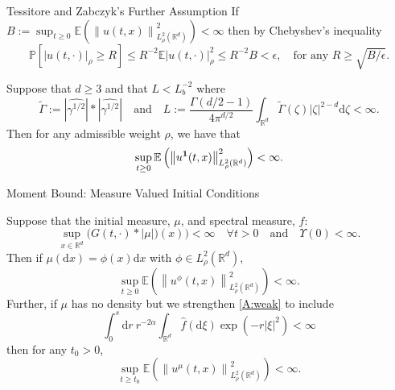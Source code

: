 \documentclass{beamer}%
\numberwithin{equation}{section}
\newcommand{\R}{\mathbb{R}}
\newcommand{\E}{\mathbb{E}}
\newcommand{\Norm}[1]{\left\|  #1   \right\|}
\newcommand{\ud}{\ensuremath{\mathrm{d} }}
\begin{document}
\begin{frame}{Tessitore and Zabczyk's Further Assumption}
	If $B:=\sup_{t \ge 0} \mathbb{E}\left( \Norm{u(t,x)}_{L^2_{\rho}(\R^d)}^2 \right) < \infty$ then by Chebyshev's inequality 
	\[
		\mathbb{P}[|u(t,\cdot)|_\rho \ge R] \le R^{-2}\E |u(t,\cdot)|_\rho^2 \le R^{-2}B < \epsilon, \quad \text{for any } R \ge \sqrt{B/\epsilon}.
	\]
	\begin{theorem}
		Suppose that $d \ge 3$ and that $L < L_b^{-2}$ where 
		\[
			\tilde{\Gamma} := \left|\widehat{\gamma^{1/2}}\right| * \left|\widehat{\gamma^{1/2}}\right| \quad \text{and} \quad L:= \frac{\Gamma(d/2-1)}{4\pi^{d/2}}\int_{\R^d} \tilde\Gamma(\zeta) |\zeta|^{2-d} \ud \zeta < \infty.
		\]
		Then for any admissible weight $\rho$, we have that 
			\[
			\sup_{t \ge 0} \mathbb{E}\left( \Norm{u^{\bf 1}(t,x)}_{L^2_{\rho}(\R^d)}^2 \right) < \infty.
			\]
	\end{theorem}
	\end{frame}

\begin{frame}{Moment Bound: Measure Valued Initial Conditions}
\begin{Theorem}
	Suppose that the initial measure, $\mu$, and spectral measure, $\hat{f}$:
	\begin{equation}
	\label{A:weak}
		\sup_{x\in \R^d}	\big(G(t,\cdot)*|\mu|)(x) \big) < \infty \quad \forall t>0 \quad \text{and} \quad \Upsilon(0) < \infty.
	\end{equation}
	Then if $\mu(\ud x) = \phi(x) \ud x$ with $\phi \in L^2_{\rho}(\R^d)$,
	\[
		\sup_{t \ge 0} \mathbb{E}\left( \Norm{u^\phi(t,x)}_{L^2_{\rho}(\R^d)}^2 \right) < \infty.
	\]
	Further, if $\mu$ has no density but we strengthen \eqref{A:weak} to include
		\[
		\int_0^s \ud r \: r^{-2\alpha} \int_{\R^{d}} \hat f(\ud \xi) \exp\left(-r|\xi|^2 \right) < \infty
		\]
	then for any $t_0 >0$,
		\[
			\sup_{t \ge t_0} \mathbb{E}\left( \Norm{u^\mu(t,x)}_{L^2_{\rho}(\R^d)}^2 \right) < \infty.
		\]
\end{Theorem}
\end{frame}
\end{document}
